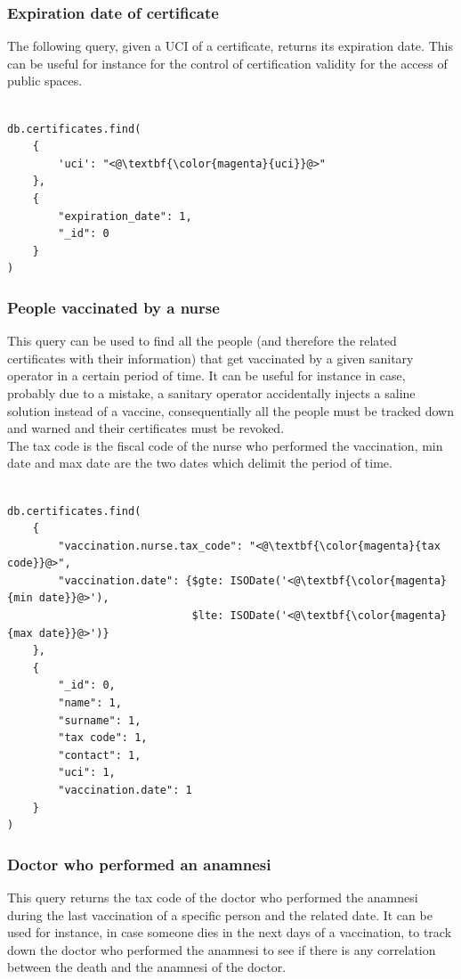 \documentclass{article}
\begin{document}
\subsubsection{Expiration date of certificate}
The following query, given a UCI of a certificate, returns its expiration date. This can be useful for instance for the control of certification validity for the access of public spaces. 

\begin{lstlisting}[language=cypher, label=lst:cypher-example]

db.certificates.find(
    {
        'uci': "<@\textbf{\color{magenta}{uci}}@>"
    },
    {
        "expiration_date": 1,
        "_id": 0
    }
)

\end{lstlisting}
\subsubsection{People vaccinated by a nurse}
\label{subsec:nurse-query}
This query can be used to find all the people (and therefore the related certificates with their information) that get vaccinated by a given sanitary operator in a certain period of time. It can be useful for instance in case, probably due to a mistake, a sanitary operator accidentally injects a saline solution instead of a vaccine, consequentially all the people must be tracked down and warned and their certificates must be revoked.\\
The tax code is the fiscal code of the nurse who performed the vaccination, min date and max date are the two dates which delimit the period of time.

\begin{lstlisting}[language=cypher, label=lst:cypher-example]

db.certificates.find(
    {
        "vaccination.nurse.tax_code": "<@\textbf{\color{magenta}{tax code}}@>",
        "vaccination.date": {$gte: ISODate('<@\textbf{\color{magenta}{min date}}@>'),
                             $lte: ISODate('<@\textbf{\color{magenta}{max date}}@>')}
    },
    {
        "_id": 0,
        "name": 1,
        "surname": 1,
        "tax code": 1,
        "contact": 1,
        "uci": 1,
        "vaccination.date": 1
    }
)

\end{lstlisting}
\newpage
\subsubsection{Doctor who performed an anamnesi}
This query returns the tax code of the doctor who performed the anamnesi during the last vaccination of a specific person and the related date.
It can be used for instance, in case someone dies in the next days of a vaccination, to track down the doctor who performed the anamnesi to see if there is any correlation between the death and the anamnesi of the doctor. 
\end{document}
